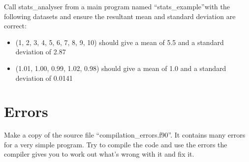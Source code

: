 \documentclass[11pt,a4paper]{article}
\begin{document}
Call stats\_analyser from a main program named ``stats\_example''with the following datasets and ensure the resultant mean and standard deviation are correct:
\begin{itemize}
    \item (1, 2, 3, 4, 5, 6, 7, 8, 9, 10) should give a mean of 5.5 and a standard deviation of 2.87
    \item (1.01, 1.00, 0.99, 1.02, 0.98) should give a mean of 1.0 and a standard deviation of  0.0141
\end{itemize}

\section{Errors}
Make a copy of the source file ``compilation\_errors.f90''. It contains many errors for a very simple program. Try to compile the code and use the errors the compiler gives you to work out what's wrong with it and fix it.
\end{document}
